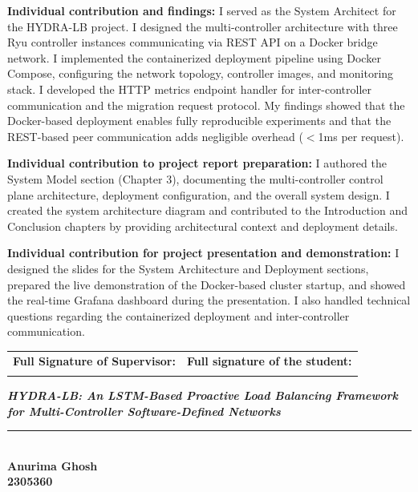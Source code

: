 \documentclass[12pt,a4paper]{report}
\newcommand{\ProjectTitle}{HYDRA-LB: An LSTM-Based Proactive Load Balancing Framework for Multi-Controller Software-Defined Networks}
\begin{document}
\vspace{0.5cm}
\noindent\textbf{Individual contribution and findings:} I served as the System Architect for the HYDRA-LB project. I designed the multi-controller architecture with three Ryu controller instances communicating via REST API on a Docker bridge network. I implemented the containerized deployment pipeline using Docker Compose, configuring the network topology, controller images, and monitoring stack. I developed the HTTP metrics endpoint handler for inter-controller communication and the migration request protocol. My findings showed that the Docker-based deployment enables fully reproducible experiments and that the REST-based peer communication adds negligible overhead ($<$1ms per request).

\vspace{0.5cm}
\noindent\textbf{Individual contribution to project report preparation:} I authored the System Model section (Chapter 3), documenting the multi-controller control plane architecture, deployment configuration, and the overall system design. I created the system architecture diagram and contributed to the Introduction and Conclusion chapters by providing architectural context and deployment details.

\vspace{0.5cm}
\noindent\textbf{Individual contribution for project presentation and demonstration:} I designed the slides for the System Architecture and Deployment sections, prepared the live demonstration of the Docker-based cluster startup, and showed the real-time Grafana dashboard during the presentation. I also handled technical questions regarding the containerized deployment and inter-controller communication.

\vspace{1.5cm}
\noindent\begin{tabular}{p{7cm}p{7cm}}
\textbf{Full Signature of Supervisor:} & \textbf{Full signature of the student:} \\
\dotfill & \dotfill \\
\end{tabular}

\newpage
\thispagestyle{fancy}
\begin{center}
{\large \textbf{\textit{\ProjectTitle}}}\\
\rule{\textwidth}{0.4pt}\\[1cm]

{\Large \textbf{Anurima Ghosh}}\\
{\large \textbf{2305360}}\\[0.8cm]
\end{center}
\end{document}
